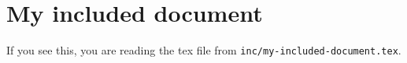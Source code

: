 \section{My included document}
If you see this, you are reading the tex file from \texttt{inc/my-included-document.tex}.

